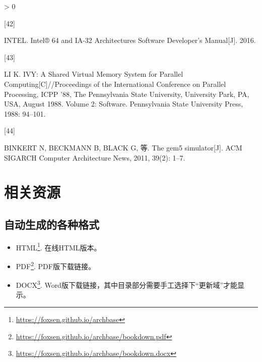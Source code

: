 \documentclass[]{ctexbook}
\newlength{\cslhangindent}
\newlength{\csllabelwidth}
\newenvironment{CSLReferences}[3] %
 {%
  \setlength{\parindent}{0pt}
  \ifodd #1 \everypar{\setlength{\hangindent}{\cslhangindent}}\ignorespaces\fi
  \ifnum #2 > 0
  \setlength{\parskip}{#3\baselineskip}
  \fi
 }%
 {}
\newcommand{\CSLLeftMargin}[1]{\parbox[t]{\maxof{\widthof{#1}}{\csllabelwidth}}{#1}}
\newcommand{\CSLRightInline}[1]{\parbox[t]{\linewidth}{#1}}
\providecommand{\tightlist}{%
  \setlength{\itemsep}{0pt}\setlength{\parskip}{0pt}}
\renewcommand{\href}[2]{#2\footnote{\url{#1}}}
\begin{document}
\begin{CSLReferences}{0}{0}
\leavevmode\hypertarget{ref-intel_intel_2016}{}%
\CSLLeftMargin{{[}42{]} }
\CSLRightInline{INTEL. Intel® 64 and {IA}-32 {Architectures} {Software} {Developer}'s {Manual}{[}J{]}. 2016.}

\leavevmode\hypertarget{ref-li_ivy_1988}{}%
\CSLLeftMargin{{[}43{]} }
\CSLRightInline{LI K. {IVY}: {A} {Shared} {Virtual} {Memory} {System} for {Parallel} {Computing}{[}C{]}//Proceedings of the {International} {Conference} on {Parallel} {Processing}, {ICPP} '88, {The} {Pennsylvania} {State} {University}, {University} {Park}, {PA}, {USA}, {August} 1988. {Volume} 2: {Software}. Pennsylvania State University Press, 1988: 94--101.}

\leavevmode\hypertarget{ref-binkert_gem5_2011}{}%
\CSLLeftMargin{{[}44{]} }
\CSLRightInline{BINKERT N, BECKMANN B, BLACK G, 等. The gem5 simulator{[}J{]}. ACM SIGARCH Computer Architecture News, 2011, 39(2): 1--7.}

\end{CSLReferences}

\newpage

\hypertarget{ux76f8ux5173ux8d44ux6e90}{%
\chapter*{相关资源}\label{ux76f8ux5173ux8d44ux6e90}}



\hypertarget{ux81eaux52a8ux751fux6210ux7684ux5404ux79cdux683cux5f0f}{%
\section*{自动生成的各种格式}\label{ux81eaux52a8ux751fux6210ux7684ux5404ux79cdux683cux5f0f}}


\begin{itemize}
\tightlist
\item
  \href{https://foxsen.github.io/archbase}{HTML}. 在线HTML版本。
\item
  \href{https://foxsen.github.io/archbase/bookdown.pdf}{PDF}. PDF版下载链接。
\item
  \href{https://foxsen.github.io/archbase/bookdown.docx}{DOCX}. Word版下载链接，其中目录部分需要手工选择下``更新域''才能显示。
\end{itemize}

\backmatter
\printindex
\end{document}
